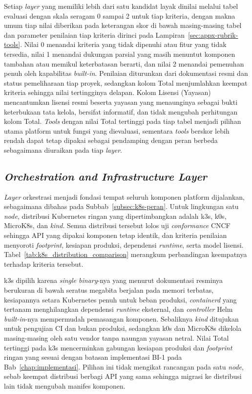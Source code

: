 Setiap \textit{layer} yang memiliki lebih dari satu kandidat layak dinilai melalui tabel evaluasi dengan skala seragam 0 sampai 2 untuk tiap kriteria, dengan makna umum tiap nilai diberikan pada keterangan skor di bawah masing-masing tabel dan parameter penilaian tiap kriteria dirinci pada Lampiran~\ref{sec:appx-rubrik-tools}. Nilai 0 menandai kriteria yang tidak dipenuhi atau fitur yang tidak tersedia, nilai 1 menandai dukungan parsial yang masih menuntut komponen tambahan atau memikul keterbatasan berarti, dan nilai 2 menandai pemenuhan penuh oleh kapabilitas \textit{built-in}. Penilaian diturunkan dari dokumentasi resmi dan status pemeliharaan tiap proyek, sedangkan kolom Total menjumlahkan keempat kriteria sehingga nilai tertingginya delapan. Kolom Lisensi (Yayasan) mencantumkan lisensi resmi beserta yayasan yang menaunginya sebagai bukti keterbukaan tata kelola, bersifat informatif, dan tidak mengubah perhitungan kolom Total. \textit{Tools} dengan nilai Total tertinggi pada tiap tabel menjadi pilihan utama platform untuk fungsi yang dievaluasi, sementara \textit{tools} berskor lebih rendah dapat tetap dipakai sebagai pendamping dengan peran berbeda sebagaimana diuraikan pada tiap \textit{layer}.

\subsection{\textit{Orchestration and Infrastructure Layer}}
\label{subsec:pilih-orkestrasi}

\textit{Layer} orkestrasi menjadi fondasi tempat seluruh komponen platform dijalankan, sebagaimana dibahas pada Subbab~\ref{subsec:k8s-peran}. Untuk lingkungan satu \textit{node}, distribusi Kubernetes ringan yang dipertimbangkan adalah k3s, k0s, MicroK8s, dan \textit{kind}. Semua distribusi tersebut lolos uji \textit{conformance} CNCF sehingga API yang dipakai komponen tetap identik, dan kriteria penilaian menyoroti \textit{footprint}, kesiapan produksi, dependensi \textit{runtime}, serta model lisensi. Tabel~\ref{tab:k8s_distribution_comparison} merangkum perbandingan keempatnya terhadap kriteria tersebut.

k3s dipilih karena \textit{single binary}-nya yang menurut dokumentasi resminya berukuran di bawah seratus megabita berjalan pada memori terbatas, kesiapannya setara Kubernetes penuh untuk beban produksi, \textit{containerd} yang tertanam menghilangkan dependensi \textit{runtime} eksternal, dan \textit{controller} Helm \textit{built-in}-nya mempermudah pemasangan komponen. Sebaliknya \textit{kind} ditujukan untuk pengujian CI dan bukan produksi, sedangkan k0s dan MicroK8s dikelola masing-masing oleh satu vendor tanpa naungan yayasan netral. Nilai Total tertinggi pada k3s mencerminkan gabungan kesiapan produksi dan \textit{footprint} ringan yang sesuai dengan batasan implementasi BI-1 pada Bab~\ref{chap:implementasi}. Pilihan ini tidak mengikat rancangan pada satu \textit{node}, sebab keempat distribusi berbagi API yang sama sehingga migrasi ke distribusi lain tidak mengubah manifes komponen.


